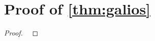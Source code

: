 \section{Proof of \autoref{thm:galios}}\label{sec:galois}

\galois

\begin{proof}
    \pf\
    \prove{}
\end{proof}
